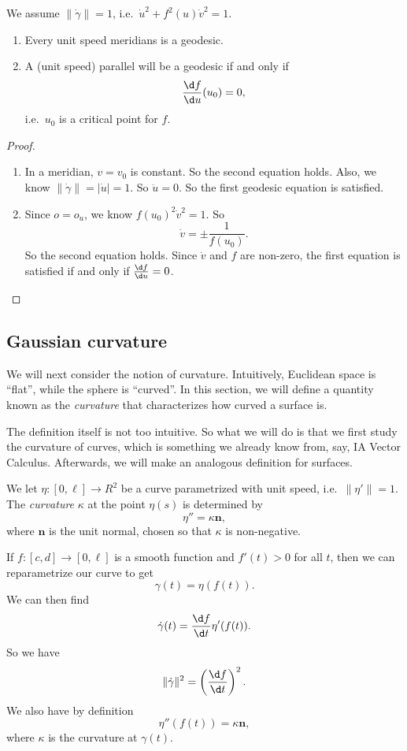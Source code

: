 \documentclass[a4paper]{article}
\begin{document}
\begin{prop}
  We assume $\|\dot{\gamma}\| = 1$, i.e.\ $\dot{u}^2 + f^2 (u) \dot{v}^2 = 1$.
  \begin{enumerate}
    \item Every unit speed meridians is a geodesic.
    \item A (unit speed) parallel will be a geodesic if and only if
      \[
        \frac{\d f}{\d u} (u_0) = 0,
      \]
      i.e.\ $u_0$ is a critical point for $f$.
  \end{enumerate}
\end{prop}

\begin{proof}\leavevmode
  \begin{enumerate}
    \item In a meridian, $v = v_0$ is constant. So the second equation holds. Also, we know $\|\dot{\gamma}\| = |\dot{u}| = 1$. So $\ddot{u} = 0$. So the first geodesic equation is satisfied.
    \item Since $o = o_u$, we know $f(u_0)^2 \dot{v}^2 = 1$. So
      \[
        \dot{v} = \pm \frac{1}{f(u_0)}.
      \]
      So the second equation holds. Since $\dot{v}$ and $f$ are non-zero, the first equation is satisfied if and only if $\frac{\d f}{\d u} = 0$.\qedhere
  \end{enumerate}
\end{proof}

\subsection{Gaussian curvature}
We will next consider the notion of curvature. Intuitively, Euclidean space is ``flat'', while the sphere is ``curved''. In this section, we will define a quantity known as the \emph{curvature} that characterizes how curved a surface is.

The definition itself is not too intuitive. So what we will do is that we first study the curvature of curves, which is something we already know from, say, IA Vector Calculus. Afterwards, we will make an analogous definition for surfaces.

\begin{defi}
  We let $\eta: [0, \ell] \to R^2$ be a curve parametrized with unit speed, i.e.\ $\|\eta'\| = 1$. The \emph{curvature} $\kappa$ at the point $\eta(s)$ is determined by
  \[
    \eta'' = \kappa \mathbf{n},
  \]
  where $\mathbf{n}$ is the unit normal, chosen so that $\kappa$ is non-negative.
\end{defi}
If $f: [c, d] \to [0, \ell]$ is a smooth function and $f'(t) > 0$ for all $t$, then we can reparametrize our curve to get
\[
  \gamma(t) = \eta(f(t)).
\]
We can then find
\[
  \dot{\gamma}(t) = \frac{\d f}{\d t} \eta'(f(t)).
\]
So we have
\[
  \|\dot{\gamma}\|^2 =\left(\frac{\d f}{\d t}\right)^2.
\]
We also have by definition
\[
  \eta''(f(t)) = \kappa \mathbf{n},
\]
where $\kappa$ is the curvature at $\gamma(t)$.
\end{document}
